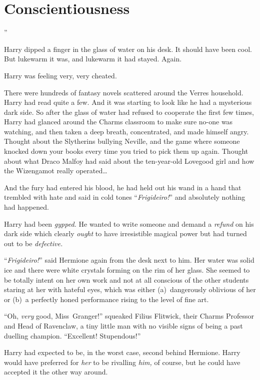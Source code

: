\chapter{Conscientiousness}

”

\hplettrineextrapara
Harry dipped a finger in the glass of water on his desk. It should have been cool. But lukewarm it was, and lukewarm it had stayed. Again.

Harry was feeling very, very cheated.

There were hundreds of fantasy novels scattered around the Verres household. Harry had read quite a few. And it was starting to look like he had a mysterious dark side. So after the glass of water had refused to cooperate the first few times, Harry had glanced around the Charms classroom to make sure no-one was watching, and then taken a deep breath, concentrated, and made himself angry. Thought about the Slytherins bullying Neville, and the game where someone knocked down your books every time you tried to pick them up again. Thought about what Draco Malfoy had said about the ten-year-old Lovegood girl and how the Wizengamot really operated…

And the fury had entered his blood, he had held out his wand in a hand that trembled with hate and said in cold tones “\emph{Frigideiro!}” and absolutely nothing had happened.

Harry had been \emph{gypped.} He wanted to write someone and demand a \emph{refund} on his dark side which clearly \emph{ought} to have irresistible magical power but had turned out to be \emph{defective.}

“\emph{Frigideiro!}” said Hermione again from the desk next to him. Her water was solid ice and there were white crystals forming on the rim of her glass. She seemed to be totally intent on her own work and not at all conscious of the other students staring at her with hateful eyes, which was either (a)~dangerously oblivious of her or (b)~a perfectly honed performance rising to the level of fine art.

“Oh, \emph{very} good, Miss~Granger!” squeaked Filius Flitwick, their Charms Professor and Head of Ravenclaw, a tiny little man with no visible signs of being a past duelling champion. “Excellent! Stupendous!”

Harry had expected to be, in the worst case, second behind Hermione. Harry would have preferred for \emph{her} to be rivalling \emph{him,} of course, but he could have accepted it the other way around.

